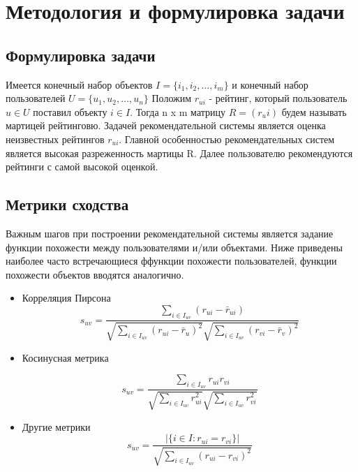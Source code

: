 \documentclass[12pt]{article} %
\begin{document}
\section{Методология и формулировка задачи}
\subsection{Формулировка задачи}
Имеется конечный набор объектов $I=\{i_{1}, i_{2}, \dots, i_{m}\}$ и конечный набор пользователей $U=\{u_{1}, u_{2}, \dots, u_{n}\}$
Положим $r_{ui}$ - рейтинг, который пользователь $u\in U$ поставил объекту $i\in I$. Тогда n x m матрицу  $R = (r_ui) $ будем называть мартицей рейтинговю. Задачей рекомендательной системы является оценка неизвестных рейтингов $r_{ui}$. Главной особенностью рекомендательных систем является высокая разреженность мартицы R.
Далее пользователю рекомендуются рейтинги с самой высокой оценкой. 

\subsection{Метрики сходства}
Важным шагов при построении рекомендательной системы является задание функции похожести между пользователями и/или объектами. Ниже приведены наиболее часто встречающиеся ффункции похожести пользователей, функции похожести объектов вводятся аналогично.
\begin{itemize}

\item{Корреляция Пирсона}
\[
s_{uv} = \frac{\sum_{i \in I_{uv}} (r_{ui} - \bar{r}_{ui})}{\sqrt{\sum_{i \in I_{uv}}  (r_{ui} - \bar{r}_{u})^2} \sqrt{\sum_{i \in I_{uv}}  (r_{vi} - \bar{r}_{v})^2}}
\]
\item{Косинусная метрика}

\[
s_{uv} = \frac{\sum_{i \in I_{uv}} r_{ui}r_{vi}} {\sqrt{\sum_{i \in I_{uv}} r_{ui}^2} \sqrt{\sum_{i \in I_{uv}} r_{vi}^2}}
\]

\vspace*{2\baselineskip}
\item{Другие метрики}
\[s_{uv} = \frac{|\{i \in I: r_{ui} = r_{vi}\}|}{\sqrt{\sum_{i \in I_{uv}} (r_{ui} - r_{vi})^2 }}
\]
\end{itemize}
\end{document}
